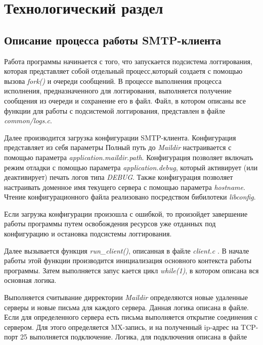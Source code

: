 \documentclass[a4paper,12pt]{report}
\begin{document}
	\chapter{Технологический раздел}


	\section{Описание процесса работы SMTP-клиента}

	Работа программы начинается с того, что запускается подсистема логгирования, 
	которая представляет собой отдельный процесс,который создаетя с помощью вызова \textit{fork()} и очереди сообщений.
	 В процессе выполнения процесса исполнения, предназначенного для логгирования, 
	 выполняется получение сообщения из очереди и сохранение его в файл.
	  Файл, в котором описаны все функции для работы с подсистемой логгирования, представлен в файле \textit{common/logs.c}.


	Далее производится загрузка конфигурации SMTP-клиента.
	 Конфигурация представляет из себя параметры
	   Полный путь до \textit{Maildir} настраивается с помощью параметра \textit{application.maildir.path}.
	    Конфигурация позволяет включать режим отладки с помощью параметра \textit{application.debug}, 
		который активирует (или деактивирует) печать логов типа \textit{DEBUG}. 
		Также конфигурация позволяет настраивать доменное имя текущего сервера с помощью параметра \textit{hostname}. 
		Чтение конфигурационного файла реализовано посредством бибилотеки \textit{libconfig}.

	Если загрузка конфигурации произошла с ошибкой,
	 то произойдет завершение работы программы путем освобождения ресурсов 
	 уже отданных под конфигурацию и остановка подсистемы логгирования.
		

	Далее вызывается функция  \textit{run\_client()}, описанная в файле \textit{client.c} .
	В начале работы этой функции производится инициализация основного контекста работы программы.
	Затем выполняется запус кается цикл \textit{while(1)}, в котором описана вся основная логика.
	
	Выполняется считывание дирректории \textit{Maildir} определяются новые удаленные серверы и новые письма для каждого сервера.
	Данная логика описана в файле.
	Если для определенного сервера есть письма выполняется открытие соединения с сервером. Для этого определяется MX-запись, и на полученный  ip-адрес на TCP-порт 25 выполняется подключение.
	Логика, для подключения описана в файле
\end{document}

